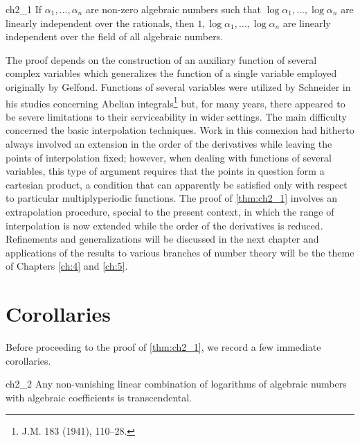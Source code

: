 \begin{mythm}{}{ch2_1}
If $\alpha_1, \dots, \alpha_n$ are non-zero algebraic numbers such that $\log \alpha_1, \dots, \log \alpha_n$ are linearly independent over the rationals, then $1, \log \alpha_1, \dots, \log \alpha_n$ are linearly independent over the field of all algebraic numbers.
\end{mythm}

The proof depends on the construction of an auxiliary function of several complex variables which generalizes the function of a single variable employed originally by Gelfond. Functions of several variables were utilized by Schneider in his studies concerning Abelian integrals\footnote{J.M. 183 (1941), 110--28.} but, for many years, there appeared to be severe limitations to their serviceability in wider settings. The main difficulty concerned the basic interpolation techniques. Work in this connexion had hitherto always involved an extension in the order of the derivatives while leaving the points of interpolation fixed; however, when dealing with functions of several variables, this type of argument requires that the points in question form a cartesian product, a condition that can apparently be satisfied only with respect to particular multiplyperiodic functions. The proof of \autoref{thm:ch2_1} involves an extrapolation procedure, special to the present context, in which the range of interpolation is now extended while the order of the derivatives is reduced. Refinements and generalizations will be discussed in the next chapter and applications of the results to various branches of number theory will be the theme of Chapters \ref{ch:4} and \ref{ch:5}.

\section{Corollaries}

Before proceeding to the proof of \autoref{thm:ch2_1}, we record a few immediate corollaries.

\begin{mythm}{}{ch2_2}
Any non-vanishing linear combination of logarithms of algebraic numbers with algebraic coefficients is transcendental.
\end{mythm}

